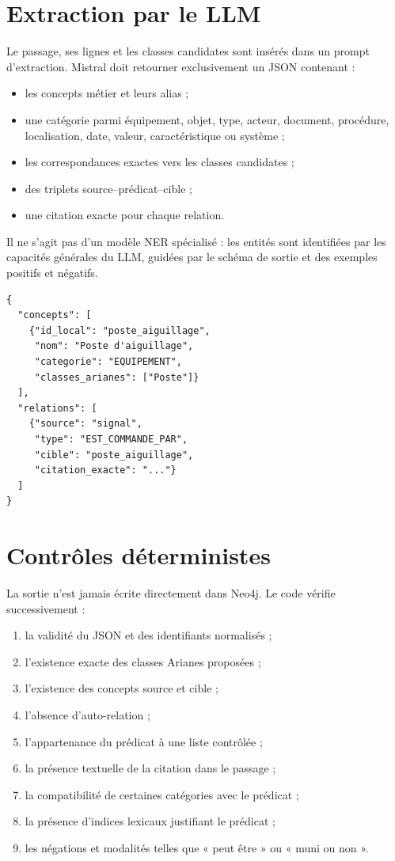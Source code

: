 \section{Extraction par le LLM}

Le passage, ses lignes et les classes candidates sont insérés dans un prompt d'extraction. Mistral doit retourner exclusivement un JSON contenant :

\begin{itemize}
  \item les concepts métier et leurs alias ;
  \item une catégorie parmi équipement, objet, type, acteur, document, procédure, localisation, date, valeur, caractéristique ou système ;
  \item les correspondances exactes vers les classes candidates ;
  \item des triplets source--prédicat--cible ;
  \item une citation exacte pour chaque relation.
\end{itemize}

Il ne s'agit pas d'un modèle NER spécialisé : les entités sont identifiées par les capacités générales du LLM, guidées par le schéma de sortie et des exemples positifs et négatifs.

\begin{lstlisting}[language={},caption={Sortie attendue de l'extracteur}]
{
  "concepts": [
    {"id_local": "poste_aiguillage",
     "nom": "Poste d'aiguillage",
     "categorie": "EQUIPEMENT",
     "classes_arianes": ["Poste"]}
  ],
  "relations": [
    {"source": "signal",
     "type": "EST_COMMANDE_PAR",
     "cible": "poste_aiguillage",
     "citation_exacte": "..."}
  ]
}
\end{lstlisting}

\section{Contrôles déterministes}

La sortie n'est jamais écrite directement dans Neo4j. Le code vérifie successivement :

\begin{enumerate}
  \item la validité du JSON et des identifiants normalisés ;
  \item l'existence exacte des classes Arianes proposées ;
  \item l'existence des concepts source et cible ;
  \item l'absence d'auto-relation ;
  \item l'appartenance du prédicat à une liste contrôlée ;
  \item la présence textuelle de la citation dans le passage ;
  \item la compatibilité de certaines catégories avec le prédicat ;
  \item la présence d'indices lexicaux justifiant le prédicat ;
  \item les négations et modalités telles que « peut être » ou « muni ou non ».
\end{enumerate}

